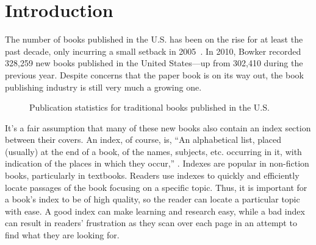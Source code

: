 \section{Introduction}

The number of books published in the U.S. has been on the rise for at least the past decade, only incurring a small setback in 2005~\cite{bowker}.
In 2010, Bowker recorded 328,259 new books published in the United States---up from 302,410 during the previous year.
Despite concerns that the paper book is on its way out, the book publishing industry is still very much a growing one.

\begin{figure}
\begin{center}
\label{fig:new-books}
\caption{Publication statistics for traditional books published in the U.S.\cite{bowker}}
\end{center}
\end{figure}

It's a fair assumption that many of these new books also contain an index section between their covers.
An index, of course, is, ``An alphabetical list, placed (usually) at the end of a book, of the names, subjects, etc. occurring in it, with indication of the places in which they occur,'' \cite{oed-index}.
Indexes are popular in non-fiction books, particularly in textbooks.
Readers use indexes to quickly and efficiently locate passages of the book focusing on a specific topic.
Thus, it is important for a book's index to be of high quality, so the reader can locate a particular topic with ease.
A good index can make learning and research easy, while a bad index can result in readers' frustration as they scan over each page in an attempt to find what they are looking for.

